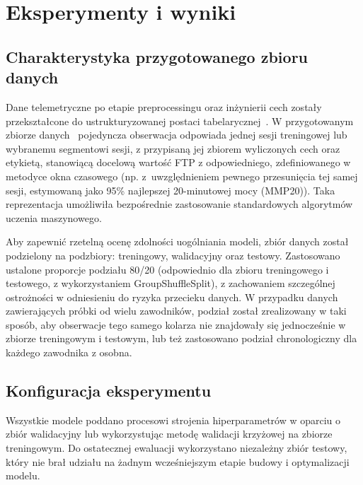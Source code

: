 \chapter{Eksperymenty i wyniki}

\section{Charakterystyka przygotowanego zbioru danych}
Dane telemetryczne po etapie preprocessingu oraz inżynierii cech zostały przekształcone do ustrukturyzowanej postaci tabelarycznej~\cite{garmin_fit_sdk, topografix_gpx}. W przygotowanym zbiorze danych~\cite{kaggle_redlineracer_road_cycling_performance_testing, figshare_cycling_analytics_datasets} pojedyncza obserwacja odpowiada jednej sesji treningowej lub wybranemu segmentowi sesji, z przypisaną jej zbiorem wyliczonych cech oraz etykietą, stanowiącą docelową wartość FTP z odpowiedniego, zdefiniowanego w metodyce okna czasowego (np. z~uwzględnieniem pewnego przesunięcia tej samej sesji, estymowaną jako 95\% najlepszej 20-minutowej mocy (MMP20)). Taka reprezentacja umożliwiła bezpośrednie zastosowanie standardowych algorytmów uczenia maszynowego. 

Aby zapewnić rzetelną ocenę zdolności uogólniania modeli, zbiór danych został podzielony na podzbiory: treningowy, walidacyjny oraz testowy. Zastosowano ustalone proporcje podziału 80/20 (odpowiednio dla zbioru treningowego i testowego, z wykorzystaniem GroupShuffleSplit), z zachowaniem szczególnej ostrożności w odniesieniu do ryzyka przecieku danych. W przypadku danych zawierających próbki od wielu zawodników, podział został zrealizowany w taki sposób, aby obserwacje tego samego kolarza nie znajdowały się jednocześnie w zbiorze treningowym i testowym, lub też zastosowano podział chronologiczny dla każdego zawodnika z osobna.

\section{Konfiguracja eksperymentu}
Wszystkie modele poddano procesowi strojenia hiperparametrów w oparciu o zbiór walidacyjny lub wykorzystując metodę walidacji krzyżowej na zbiorze treningowym. Do ostatecznej ewaluacji wykorzystano niezależny zbiór testowy, który nie brał udziału na żadnym wcześniejszym etapie budowy i optymalizacji modelu.

